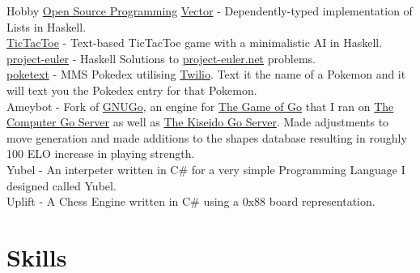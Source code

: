 \documentclass[10pt,letterpaper,sans]{moderncv}
\newcommand{\wlink}[2]{\textcolor[HTML]{0020B6}{\href{#1}{#2}}}
\begin{document}
        {Hobby}
        {\wlink{https://github.com/chessai}{Open Source Programming}}
        {}{}{
        \wlink{https://github.com/chessai/Vector}{Vector} - Dependently-typed implementation of Lists in Haskell. \\ %
        \wlink{https://github.com/chessai/TicTacToe}{TicTacToe} - Text-based TicTacToe game with a minimalistic AI in Haskell. \\ %
        \wlink{https://github.com/chessai/project-euler}{project-euler} - Haskell Solutions to \wlink{https://projecteuler.net/}{project-euler.net} problems. \\ %
        \wlink{https://github.com/chessai/poketext}{poketext} - MMS Pokedex utilising \wlink{https://www.twilio.com/sms}{Twilio}. Text it the name of a Pokemon and it will text you the Pokedex entry for that Pokemon. \\ %
        Ameybot - Fork of \wlink{https://www.gnu.org/software/gnugo/}{GNUGo}, an engine for \wlink{https://en.wikipedia.org/wiki/Go_(game)}{The Game of Go} that I ran on \wlink{http://yss-aya.com/cgos/}{The Computer Go Server} as well as \wlink{https://www.gokgs.com/}{The Kiseido Go Server}. Made adjustments to move generation and made additions to the shapes database resulting in roughly 100 ELO increase in playing strength. \\
        Yubel - An interpeter written in C\# for a very simple Programming Language I designed called Yubel. \\
        Uplift - A Chess Engine written in C\# using a 0x88 board representation.
}

\vspace{1em}

\section{Skills}
\end{document}

